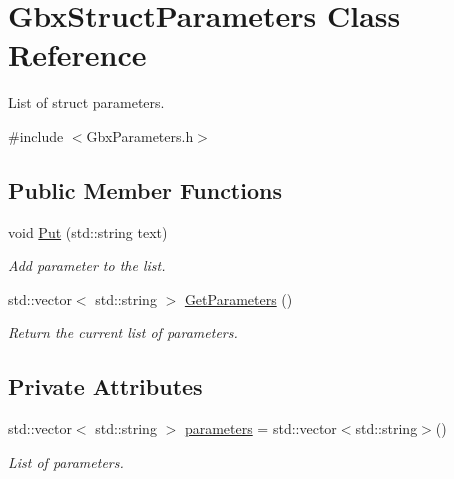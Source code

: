 \hypertarget{classGbxStructParameters}{\section{Gbx\-Struct\-Parameters Class Reference}
\label{classGbxStructParameters}
}


List of struct parameters.  




{\ttfamily \#include $<$Gbx\-Parameters.\-h$>$}

\subsection*{Public Member Functions}
\begin{DoxyCompactItemize}
\item 
void \hyperlink{classGbxStructParameters_a1e045e8f50d30cdd810df10f3346bee4}{Put} (std\-::string text)
\begin{DoxyCompactList}\small\item\em Add parameter to the list. \end{DoxyCompactList}\item 
\hypertarget{classGbxStructParameters_a5d496ceb658abca1300ae093d26abedc}{std\-::vector$<$ std\-::string $>$ \hyperlink{classGbxStructParameters_a5d496ceb658abca1300ae093d26abedc}{Get\-Parameters} ()}\label{classGbxStructParameters_a5d496ceb658abca1300ae093d26abedc}

\begin{DoxyCompactList}\small\item\em Return the current list of parameters. \end{DoxyCompactList}\end{DoxyCompactItemize}
\subsection*{Private Attributes}
\begin{DoxyCompactItemize}
\item 
\hypertarget{classGbxStructParameters_a28bc30c4732e983831d05ac4591a3aec}{std\-::vector$<$ std\-::string $>$ \hyperlink{classGbxStructParameters_a28bc30c4732e983831d05ac4591a3aec}{parameters} = std\-::vector$<$std\-::string$>$()}\label{classGbxStructParameters_a28bc30c4732e983831d05ac4591a3aec}

\begin{DoxyCompactList}\small\item\em List of parameters. \end{DoxyCompactList}\end{DoxyCompactItemize}


